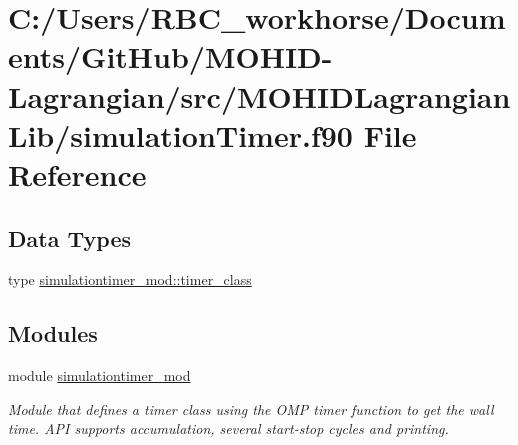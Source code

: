\hypertarget{simulation_timer_8f90}{}\section{C\+:/\+Users/\+R\+B\+C\+\_\+workhorse/\+Documents/\+Git\+Hub/\+M\+O\+H\+I\+D-\/\+Lagrangian/src/\+M\+O\+H\+I\+D\+Lagrangian\+Lib/simulation\+Timer.f90 File Reference}
\label{simulation_timer_8f90}
\subsection*{Data Types}
\begin{DoxyCompactItemize}
\item 
type \mbox{\hyperlink{structsimulationtimer__mod_1_1timer__class}{simulationtimer\+\_\+mod\+::timer\+\_\+class}}
\end{DoxyCompactItemize}
\subsection*{Modules}
\begin{DoxyCompactItemize}
\item 
module \mbox{\hyperlink{namespacesimulationtimer__mod}{simulationtimer\+\_\+mod}}
\begin{DoxyCompactList}\small\item\em Module that defines a timer class using the O\+MP timer function to get the wall time. A\+PI supports accumulation, several start-\/stop cycles and printing. \end{DoxyCompactList}\end{DoxyCompactItemize}
